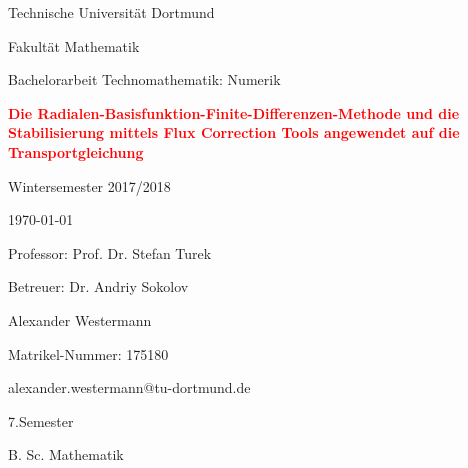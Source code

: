 \documentclass[12pt,titlepage]{article}
\begin{document}
\begin{titlepage}
\pagestyle{empty}
 \centering
 {\LARGE Technische Universität Dortmund \par}
 \vspace{0.5cm}
 {\LARGE Fakultät Mathematik \par}
 \vspace{1cm}
 {\Large Bachelorarbeit Technomathematik: Numerik \par}
 \vspace{2cm}
 {\huge\bfseries \textcolor{red}{Die Radialen-Basisfunktion-Finite-Differenzen-Methode und die Stabilisierung mittels Flux Correction Tools angewendet auf die Transportgleichung} \par}
 \vspace{2cm}
 {\Large Wintersemester 2017/2018 \par}
 \vspace{0.5cm}
 {\large \today\par}
 \vspace{1cm}
 {\Large Professor: Prof. Dr. Stefan Turek \par}
 \vspace{0.5cm}
 {\Large Betreuer: Dr. Andriy Sokolov \par}
 \vfill
 \begin{flushright}
  {Alexander Westermann \par}
  {Matrikel-Nummer: 175180 \par}
  \vspace{0.5cm}
  {alexander.westermann@tu-dortmund.de \par}
  {7.Semester \par}
  {B. Sc. Mathematik \par}
 \end{flushright}
\end{titlepage}
\pagebreak
{}
 \tableofcontents
\pagebreak
\listoffigures
\pagebreak
{}
\setcounter{page}{1}
\end{document}
